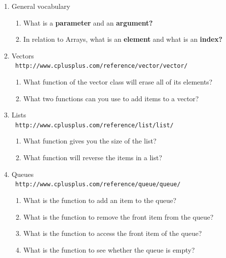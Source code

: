 \documentclass[a4paper,12pt]{book}
\begin{document}
                \begin{enumerate}
                    \item General vocabulary
                    \begin{enumerate}
                        \item What is a \textbf{ parameter } and an \textbf{ argument? }
                        \item In relation to Arrays, what is an \textbf{ element }
                            and what is an \textbf{ index? }
                    \end{enumerate}

                    \item Vectors \\ \texttt { http://www.cplusplus.com/reference/vector/vector/ }
                    \begin{enumerate}
                        \item What function of the vector class will erase all of its elements?
                        \item What two functions can you use to add items to a vector?
                    \end{enumerate}

                    \item Lists \\  \texttt{ http://www.cplusplus.com/reference/list/list/ }
                        \begin{enumerate}
                            \item What function gives you the size of the list?
                            \item What function will reverse the items in a list?
                        \end{enumerate}
                    
                    \item Queues \\ \texttt{ http://www.cplusplus.com/reference/queue/queue/ }
                        \begin{enumerate}
                            \item What is the function to add an item to the queue?
                            \item What is the function to remove the front item from the queue?
                            \item What is the function to access the front item of the queue?
                            \item What is the function to see whether the queue is empty?
                        \end{enumerate}
                        

\end{enumerate}
\end{document}
